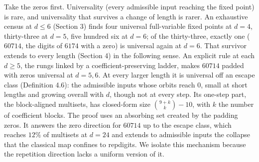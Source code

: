 \documentclass[11pt,letterpaper]{article}
\theoremstyle{paperstyle}
\theoremstyle{paperstyledef}
\theoremstyle{paperstylerem}
\begin{document}
Take the zeros first. Universality (every admissible input reaching the fixed point) is rare, and universality that survives a change of length is rarer. An exhaustive census at \(d \leq 6\) (Section 3) finds four universal full-variable fixed points at \(d=4\), thirty-three at \(d=5\), five hundred six at \(d=6\); of the thirty-three, exactly one (\(60714\), the digits of \(6174\) with a zero) is universal again at \(d=6\). That survivor extends to every length (Section 4) in the following sense. An explicit rule at each \(d \geq 5\), the rungs linked by a coefficient-preserving ladder, makes \(60714\) padded with zeros universal at \(d = 5, 6\). At every larger length it is universal off an escape class (Definition 4.6): the admissible inputs whose orbits reach \(0\), small at short lengths and growing overall with \(d\), though not at every step. Its one-step part, the block-aligned multisets, has closed-form size \(\binom{9+k}{k} - 10\), with \(k\) the number of coefficient blocks. The proof uses an absorbing set created by the padding zeros. It answers the zero direction for \(60714\) up to the escape class, which reaches \(12\%\) of multisets at \(d = 24\) and extends to admissible inputs the collapse that the classical map confines to repdigits. We isolate this mechanism because the repetition direction lacks a uniform version of it.
\end{document}
